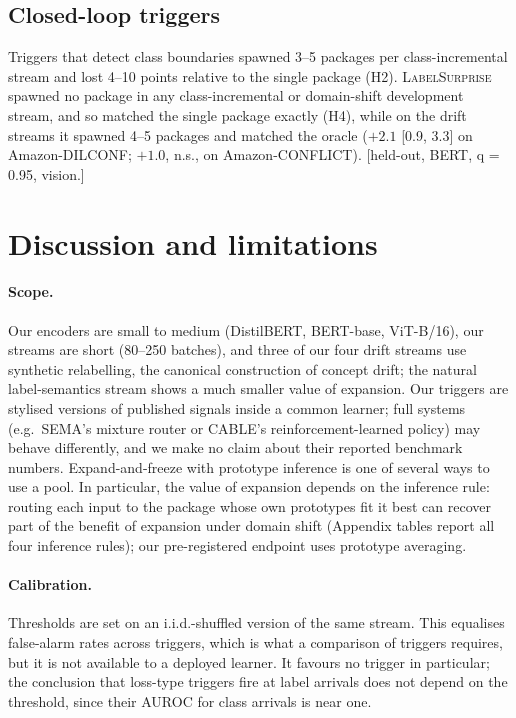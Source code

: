 \documentclass[10pt]{article}
\newcommand{\ls}{\textsc{LabelSurprise}}
\begin{document}
\subsection{Closed-loop triggers}
\label{sec:res-closed}
Triggers that detect class boundaries spawned 3--5 packages per class-incremental stream and lost 4--10 points relative to the single package (H2). \ls{} spawned no package in any class-incremental or domain-shift development stream, and so matched the single package exactly (H4), while on the drift streams it spawned 4--5 packages and matched the oracle ($+2.1$ [0.9, 3.3] on Amazon-DILCONF; $+1.0$, n.s., on Amazon-CONFLICT). [held-out, BERT, q = 0.95, vision.]



\section{Discussion and limitations}

\paragraph{Scope.} Our encoders are small to medium (DistilBERT, BERT-base, ViT-B/16), our streams are short (80--250 batches), and three of our four drift streams use synthetic relabelling, the canonical construction of concept drift; the natural label-semantics stream shows a much smaller value of expansion. Our triggers are stylised versions of published signals inside a common learner; full systems (e.g.\ SEMA's mixture router or CABLE's reinforcement-learned policy) may behave differently, and we make no claim about their reported benchmark numbers. Expand-and-freeze with prototype inference is one of several ways to use a pool. In particular, the value of expansion depends on the inference rule: routing each input to the package whose own prototypes fit it best can recover part of the benefit of expansion under domain shift (Appendix tables report all four inference rules); our pre-registered endpoint uses prototype averaging.

\paragraph{Calibration.} Thresholds are set on an i.i.d.-shuffled version of the same stream. This equalises false-alarm rates across triggers, which is what a comparison of triggers requires, but it is not available to a deployed learner. It favours no trigger in particular; the conclusion that loss-type triggers fire at label arrivals does not depend on the threshold, since their AUROC for class arrivals is near one.
\end{document}
